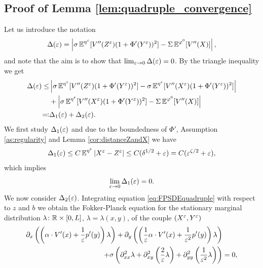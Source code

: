 \documentclass[10pt]{article}
\begin{document}
\begin{appendices}
\subsection{Proof of Lemma \ref{lem:quadruple_convergence}}

	Let us introduce the notation 
	\begin{equation}
	\Delta(\varepsilon) = \left| \sigma \operatorname{\mathbb{E}}^{\eta^\varepsilon} [V''(Z^\varepsilon) (1 + \Phi'(Y^\varepsilon))^2] - \Sigma \operatorname{\mathbb{E}}^{\varphi^0} [V''(X)] \right|,
	\end{equation}
	and note that the aim is to show that $\lim_{\varepsilon \to 0} \Delta(\varepsilon) = 0$. By the triangle inequality we get
	\begin{equation}
	\begin{aligned}
	\Delta(\varepsilon) \le& \left| \sigma \operatorname{\mathbb{E}}^{\eta^\varepsilon} [V''(Z^\varepsilon) (1 + \Phi'(Y^\varepsilon))^2] - \sigma \operatorname{\mathbb{E}}^{\eta^\varepsilon} [V''(X^\varepsilon) (1 + \Phi'(Y^\varepsilon))^2] \right| \\
	&+ \left| \sigma \operatorname{\mathbb{E}}^{\eta^\varepsilon} [V''(X^\varepsilon) (1 + \Phi'(Y^\varepsilon))^2] - \Sigma \operatorname{\mathbb{E}}^{\varphi^0} [V''(X)] \right| \\
	\eqqcolon& \Delta_1(\varepsilon) + \Delta_2(\varepsilon).
	\end{aligned}
	\end{equation}
	We first study $\Delta_1(\varepsilon)$ and due to the boundedness of $\Phi'$, Assumption \ref{as:regularity} and Lemma \ref{cor:distanceZandX} we have
	\begin{equation}
	\Delta_1(\varepsilon) \le C \operatorname{\mathbb{E}}^{\eta^\varepsilon} \left\lvert X^\varepsilon - Z^\varepsilon\right\rvert \le C (\delta^{1/2} + \varepsilon) = C (\varepsilon^{\zeta/2} + \varepsilon),
	\end{equation}
	which implies
	\begin{equation}
	\lim_{\varepsilon \to 0} \Delta_1(\varepsilon) = 0.
	\end{equation}
	We now consider $\Delta_2(\varepsilon)$. Integrating equation \eqref{eq:FPSDEquadruple} with respect to $z$ and $b$ we obtain the Fokker-Planck equation for the stationary marginal distribution $\lambda \colon \mathbb{R} \times [0,L]$, $\lambda = \lambda(x,y)$, of the couple $(X^\varepsilon,Y^\varepsilon)$
	\begin{equation}
	\begin{aligned}
	\partial_x \left( \left( \alpha \cdot V'(x) + \frac1\epl p'(y) \right) \lambda \right) + \partial_y \left( \left( \frac1\epl \alpha \cdot V'(x) + \frac{1}{\epl^2} p'(y) \right) \lambda \right) & \\
	+ \sigma \left( \partial_{xx}^2 \lambda + \partial_{xy}^2 \left( \frac2\epl \lambda \right) + \partial_{yy}^2 \left( \frac{1}{\epl^2} \lambda \right) \right) &= 0,
	\end{aligned}

\end{equation}
\end{appendices}
\end{document}
